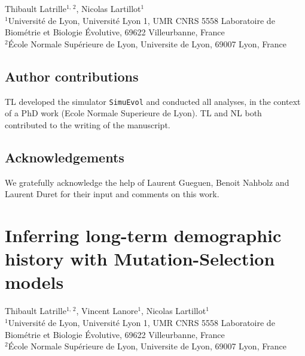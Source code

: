 \documentclass[a4paper,oneside,nobind]{thesis}
\begin{document}
    \begin{center}
        \Large Thibault Latrille$^{\text{1, 2}}$, Nicolas Lartillot$^{\text{1}}$\\
        \vspace{0.5cm}
        \normalsize
        $^{\text{1}}$Université de Lyon, Université Lyon 1, UMR CNRS 5558 Laboratoire de Biométrie et Biologie Évolutive, 69622 Villeurbanne, France\\
        $^{\text{2}}$École Normale Supérieure de Lyon, Universite de Lyon, 69007 Lyon, France\\
    \end{center}

    {\hypersetup{linkcolor=GREYDARK}\minitoc}
    


    \section{Author contributions}
    TL developed the simulator \texttt{SimuEvol} and conducted all analyses, in the context of a PhD work (Ecole Normale Superieure de Lyon).
    TL and NL both contributed to the writing of the manuscript.


    \section{Acknowledgements}
    We gratefully acknowledge the help of Laurent Gueguen, Benoit Nahbolz and Laurent Duret for their input and comments on this work.

    \thispagestyle{empty}
    \chapter[Inferring long-term population size] {Inferring long-term demographic history with Mutation-Selection models}
    \label{chap:MutSelDrift}

    \begin{center}
        \Large Thibault Latrille$^{\text{1, 2}}$, Vincent Lanore$^{\text{1}}$, Nicolas Lartillot$^{\text{1}}$\\
        \vspace{0.5cm}
        \normalsize
        $^{\text{1}}$Université de Lyon, Université Lyon 1, UMR CNRS 5558 Laboratoire de Biométrie et Biologie Évolutive, 69622 Villeurbanne, France\\
        $^{\text{2}}$École Normale Supérieure de Lyon, Universite de Lyon, 69007 Lyon, France\\
    \end{center}
\end{document}

